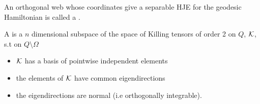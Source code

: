 \documentclass{article}
\begin{document}
\begin{definition}
An orthogonal web whose coordinates give a separable HJE for the geodesic Hamiltonian is called a .
\end{definition}

\begin{definition}
A  is a $n$ dimensional subspace of the space of Killing tensors of order 2 on $Q$, $\mathcal{K}$, s.t on $Q\setminus \Omega$
\begin{itemize}
    \item $\mathcal{K}$ has a basis of pointwise independent elements 
    \item the elements of $\mathcal{K}$ have common eigendirections
    \item the eigendirections are normal (i.e orthogonally integrable).
\end{itemize}
\end{definition}
\end{document}
